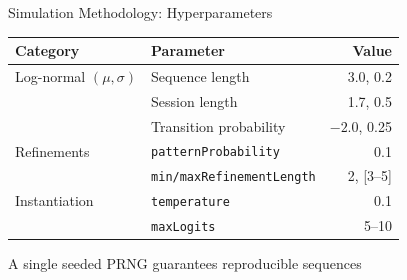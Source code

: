 \begin{frame}{Simulation Methodology: Hyperparameters}
    \centering
    \begin{tabular}{llr}
        \toprule
        \textbf{Category} & \textbf{Parameter} & \textbf{Value} \\
        \midrule
        Log-normal $(\mu, \sigma)$ & Sequence length          & 3.0, 0.2 \\
                                   & Session length           & 1.7, 0.5 \\
                                   & Transition probability   & $-2.0$, 0.25 \\
        \midrule
        Refinements   & \texttt{patternProbability}       & 0.1 \\
                      & \texttt{min/maxRefinementLength}  & 2, [3--5] \\
        \midrule
        Instantiation & \texttt{temperature}              & 0.1 \\
                      & \texttt{maxLogits}                & 5--10 \\
        \bottomrule
    \end{tabular}

    \vspace{1em}
    A single seeded PRNG guarantees reproducible sequences
\end{frame}
